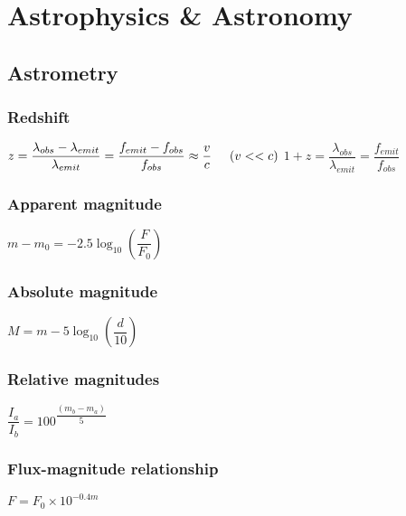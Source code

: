 \chapter{Astrophysics \& Astronomy}

	\section{Astrometry}



\subsection{Redshift}
\begin{itemize}
\itemt \( z = \dfrac{\lambda_{obs} - \lambda_{emit}}{\lambda_{emit}} =\dfrac{f_{emit} - f_{obs}}{f_{obs}} \approx \dfrac{v}{c}\tab[0.5cm] (v<<c) \)
\itemt \( 1+z = \dfrac{\lambda_{obs}}{\lambda_{emit}} = \dfrac{f_{emit}}{f_{obs}} \)
\end{itemize}

\subsection{Apparent magnitude}	
\begin{itemize}
\itemt \( m-m_0=-2.5\log_{10} (\dfrac{F}{F_0}) \)
\end{itemize}

\subsection{Absolute magnitude}
\begin{itemize}
\itemt \( M = m - 5 \log_{10} (\dfrac{d}{10}) \)
\end{itemize}

\subsection{Relative magnitudes}
\begin{itemize}
\itemt \( \dfrac{I_a}{I_b} = 100^{\dfrac{(m_b-m_a)}{5}} \)
\end{itemize}

\subsection{Flux-magnitude relationship}
\begin{itemize}
\itemt \( F = F_0\times 10^{-0.4m} \)
\end{itemize}			

